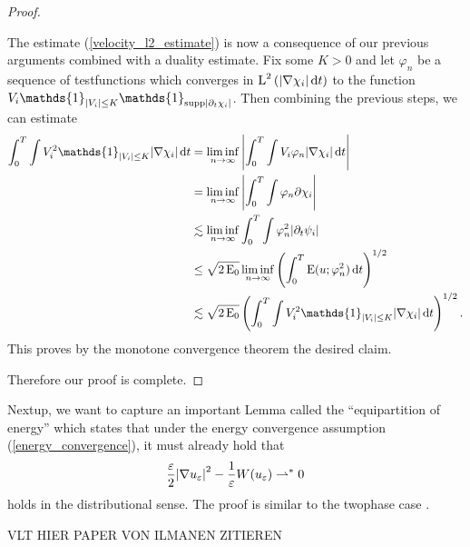 \begin{proof}
\begin{description}[wide=0pt]
		The estimate (\ref{velocity_l2_estimate}) is now a consequence of our 
		previous arguments combined with a duality estimate. Fix some $ K > 0 $ 
		and let $ \varphi_{ n } $ be a sequence of testfunctions which 
		converges in 
		$ \operatorname{L}^{ 2 } \left( \abs{ \nabla \chi_{ i } } \dd{ t } \right) $ to the 
		function
		$ V_{ i } \mathds{ 1 }_{ \abs{ V_{ i } } \leq K } \mathds{ 1 }_{ 
		\mathrm{supp} \abs{ \partial_{ t } \chi_{ i } } } $. Then combining the 
		previous steps, we can estimate
		\begin{align*}
			\int_{ 0 }^{ T }
			\int
			V_{ i }^{ 2 } \mathds{ 1 }_{ \abs{ V_{ i } } \leq K }
			\abs{ \nabla \chi_{ i } }
			\dd{ t }
			& =
			\liminf_{ n \to \infty }
			\abs{
				\int_{ 0 }^{ T }
				\int
				V_{ i } \varphi_{ n } 
				\abs{ \nabla \chi_{ i } }
				\dd{ t }
			}
			\\
			& = 
			\liminf_{ n \to \infty }
			\abs{
				\int_{ 0 }^{ T }
				\int
				\varphi_{ n } \partial \chi_{ i }
			}
			\\
			& \lesssim
			\liminf_{ n \to \infty }
			\int_{ 0 }^{ T }
			\int
			\varphi_{ n }^{ 2 }
			\abs{ \partial_{ t } \psi_{ i } }
			\\
			& \leq
			\sqrt{ 2 \energy_{ 0 } }
			\liminf_{ n \to \infty }
			\left(
			\int_{ 0 }^{ T }
			\energy ( u ; \varphi_{ n }^{ 2 } )
			\dd{ t }
			\right)^{ 1/2 }
			\\
			& \lesssim
			\sqrt{ 2 \energy_{ 0 } }
			\left(
			\int_{ 0 }^{ T }
			\int
			V_{ i }^{ 2 }
			\mathds{ 1 }_{ \abs{ V_{ i } } \leq K }
			\abs{ \nabla \chi_{ i } }
			\dd{ t }
			\right)^{ 1 / 2 }.
		\end{align*}
		This proves by the monotone convergence theorem the desired claim.
	\end{description} 
	Therefore our proof is complete.
\end{proof}

Nextup, we want to capture an important Lemma called the \enquote{equipartition 
of energy} which states that under the energy convergence assumption 
(\ref{energy_convergence}), it must already hold that
\begin{equation*}
	\frac{ \varepsilon }{ 2 } \abs{ \nabla u_{ \varepsilon } }^{ 2 }
	-
	\frac{ 1 }{ \varepsilon } W ( u_{ \varepsilon } )
	\rightharpoonup^{ \ast }
	0
\end{equation*}
holds in the distributional sense. The proof is similar to the twophase case 
.

VLT HIER PAPER VON ILMANEN ZITIEREN

